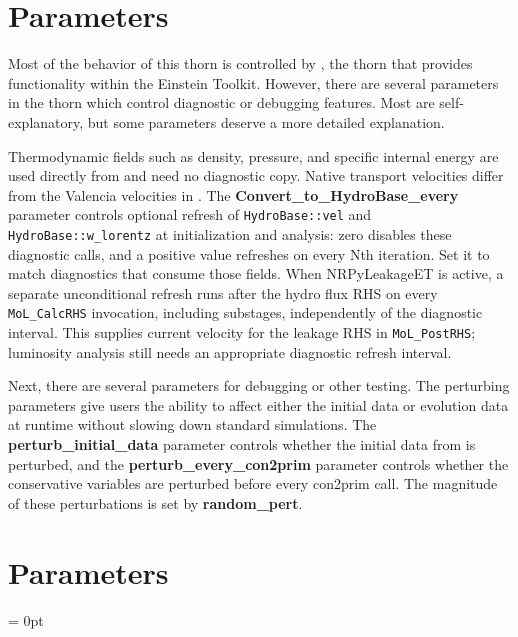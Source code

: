 \documentclass{article}
\newlength{\tableWidth} \newlength{\maxVarWidth} \newlength{\paraWidth} \newlength{\descWidth}
\begin{document}
\section{Parameters}

Most of the behavior of this thorn is controlled by \glib,
the thorn that provides \grhayl{} functionality
within the Einstein Toolkit. However, there are several
parameters in the thorn which control diagnostic or debugging
features. Most are self-explanatory, but some parameters deserve
a more detailed explanation.

Thermodynamic fields such as density, pressure, and specific internal energy
are used directly from \hydrobase{} and need no diagnostic copy. Native
transport velocities differ from the Valencia velocities in \hydrobase{}.
The \textbf{Convert\_to\_HydroBase\_every} parameter controls optional refresh
of \texttt{HydroBase::vel} and \texttt{HydroBase::w\_lorentz} at initialization
and analysis: zero disables these diagnostic calls, and a positive value
refreshes on every Nth iteration. Set it to match diagnostics that consume
those fields. When NRPyLeakageET is active, a separate unconditional refresh
runs after the hydro flux RHS on every \texttt{MoL\_CalcRHS} invocation,
including substages, independently of the diagnostic interval. This supplies
current velocity for the leakage RHS in \texttt{MoL\_PostRHS}; luminosity
analysis still needs an appropriate diagnostic refresh interval.

Next, there are several parameters for debugging or other testing.
The perturbing parameters give users the ability to affect either
the initial data or evolution data at runtime without slowing down
standard simulations. The \textbf{perturb\_initial\_data} parameter
controls whether the initial data from \hydrobase{} is perturbed, and
the \textbf{perturb\_every\_con2prim} parameter controls whether
the conservative variables are perturbed before every con2prim call.
The magnitude of these perturbations is set by \textbf{random\_pert}.




\section{Parameters} 


\parskip = 0pt

\setlength{\tableWidth}{160mm}

\setlength{\paraWidth}{\tableWidth}
\setlength{\descWidth}{\tableWidth}
\settowidth{\maxVarWidth}{convert\_to\_hydrobase\_every}
\end{document}

